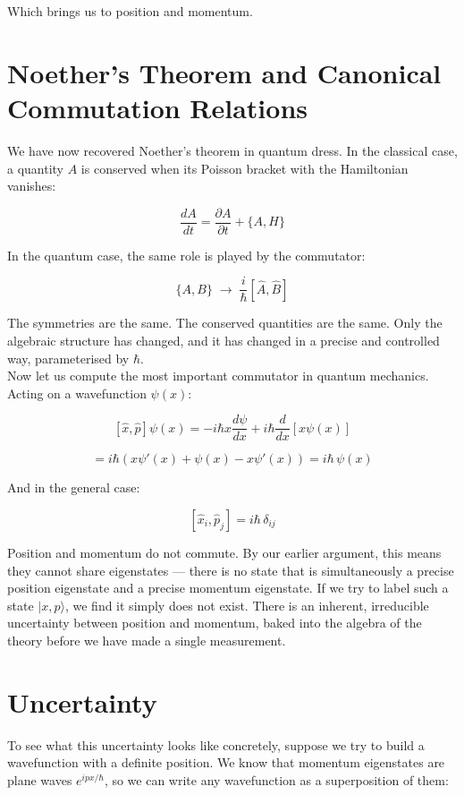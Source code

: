 \documentclass[krantz1,ChapterTOCs]{krantz}
\begin{document}
Which brings us to position and momentum.\\

\section*{Noether's Theorem and Canonical Commutation Relations}

We have now recovered Noether's theorem in quantum dress. In the 
classical case, a quantity $A$ is conserved when its Poisson bracket 
with the Hamiltonian vanishes:

$$\frac{dA}{dt} = \frac{\partial A}{\partial t} + \{A, H\}$$

In the quantum case, the same role is played by the commutator:

$$\{A, B\} \;\to\; \frac{i}{\hbar}[\hat{A}, \hat{B}]$$

The symmetries are the same. The conserved quantities are the same. 
Only the algebraic structure has changed, and it has changed in a 
precise and controlled way, parameterised by $\hbar$.\\

Now let us compute the most important commutator in quantum mechanics. 
Acting on a wavefunction $\psi(x)$:

$$[\hat{x},\hat{p}]\psi(x) 
= -i\hbar x\frac{d\psi}{dx} 
+ i\hbar\frac{d}{dx}\left[x\psi(x)\right]$$

$$= i\hbar\left(x\psi'(x) + \psi(x) - x\psi'(x)\right) 
= i\hbar\,\psi(x)$$

And in the general case:

$$\boxed{[\hat{x}_i, \hat{p}_j] = i\hbar\,\delta_{ij}}$$

Position and momentum do not commute. By our earlier argument, this 
means they cannot share eigenstates --- there is no state that is 
simultaneously a precise position eigenstate and a precise momentum 
eigenstate. If we try to label such a state $|x, p\rangle$, we find 
it simply does not exist. There is an inherent, irreducible uncertainty 
between position and momentum, baked into the algebra of the theory 
before we have made a single measurement.\\

\section*{Uncertainty}

To see what this uncertainty looks like concretely, suppose we try 
to build a wavefunction with a definite position. We know that 
momentum eigenstates are plane waves $e^{ipx/\hbar}$, so we can 
write any wavefunction as a superposition of them:
\end{document}
